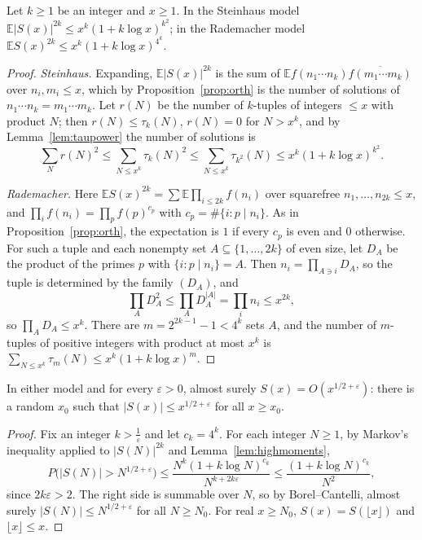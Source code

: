 \begin{lemma}\label{lem:highmoments}
Let $k\ge1$ be an integer and $x\ge1$. In the Steinhaus model $\mathbb E|S(x)|^{2k}\le x^k(1+k\log x)^{k^2}$; in the Rademacher model $\mathbb ES(x)^{2k}\le x^k(1+k\log x)^{4^k}$.
\end{lemma}
\begin{proof}
\emph{Steinhaus.} Expanding, $\mathbb E|S(x)|^{2k}$ is the sum of $\mathbb Ef(n_1\cdots n_k)\overline{f(m_1\cdots m_k)}$ over $n_i,m_i\le x$, which by Proposition~\ref{prop:orth} is the number of solutions of $n_1\cdots n_k=m_1\cdots m_k$. Let $r(N)$ be the number of $k$-tuples of integers $\le x$ with product $N$; then $r(N)\le\tau_k(N)$, $r(N)=0$ for $N>x^k$, and by Lemma~\ref{lem:taupower} the number of solutions is
\[
\sum_Nr(N)^2\le\sum_{N\le x^k}\tau_k(N)^2\le\sum_{N\le x^k}\tau_{k^2}(N)\le x^k(1+k\log x)^{k^2}.
\]

\emph{Rademacher.} Here $\mathbb ES(x)^{2k}=\sum\mathbb E\prod_{i\le2k}f(n_i)$ over squarefree $n_1,\dots,n_{2k}\le x$, and $\prod_if(n_i)=\prod_pf(p)^{c_p}$ with $c_p=\#\{i:p\mid n_i\}$. As in Proposition~\ref{prop:orth}, the expectation is $1$ if every $c_p$ is even and $0$ otherwise. For such a tuple and each nonempty set $A\subseteq\{1,\dots,2k\}$ of even size, let $D_A$ be the product of the primes $p$ with $\{i:p\mid n_i\}=A$. Then $n_i=\prod_{A\ni i}D_A$, so the tuple is determined by the family $(D_A)$, and
\[
\prod_AD_A^2\le\prod_AD_A^{|A|}=\prod_in_i\le x^{2k},
\]
so $\prod_AD_A\le x^k$. There are $m=2^{2k-1}-1<4^k$ sets $A$, and the number of $m$-tuples of positive integers with product at most $x^k$ is $\sum_{N\le x^k}\tau_m(N)\le x^k(1+k\log x)^m$.
\end{proof}

\begin{theorem}[Wintner, 1944]\label{thm:wintner}
In either model and for every $\varepsilon>0$, almost surely $S(x)=O(x^{1/2+\varepsilon})$: there is a random $x_0$ such that $|S(x)|\le x^{1/2+\varepsilon}$ for all $x\ge x_0$.
\end{theorem}
\begin{proof}
Fix an integer $k>\frac1\varepsilon$ and let $c_k=4^k$. For each integer $N\ge1$, by Markov's inequality applied to $|S(N)|^{2k}$ and Lemma~\ref{lem:highmoments},
\[
P\bigl(|S(N)|>N^{1/2+\varepsilon}\bigr)\le\frac{N^k(1+k\log N)^{c_k}}{N^{k+2k\varepsilon}}\le\frac{(1+k\log N)^{c_k}}{N^2},
\]
since $2k\varepsilon>2$. The right side is summable over $N$, so by Borel--Cantelli, almost surely $|S(N)|\le N^{1/2+\varepsilon}$ for all $N\ge N_0$. For real $x\ge N_0$, $S(x)=S(\lfloor x\rfloor)$ and $\lfloor x\rfloor\le x$.
\end{proof}

